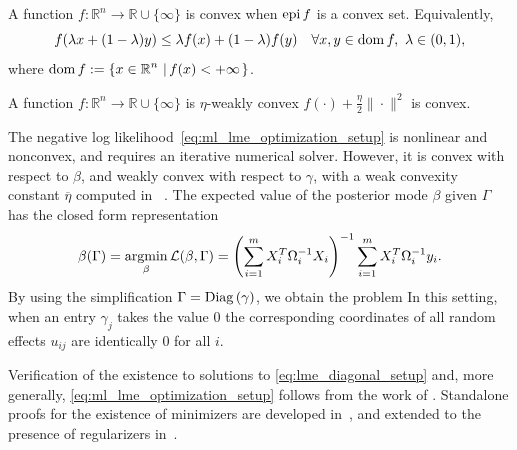 \begin{definition}[Convexity]
A function $f:\mathbb{R}^n\rightarrow \mathbb{R} \cup \{\infty\}$ is convex when $\operatorname{epi} f$ is a convex set. Equivalently, 
\[
f(\lambda x + (1-\lambda)y) \leq \lambda f(x) + (1-\lambda) f(y) \quad \forall x,y\in\operatorname{\mathrm{dom}}{f},\ \lambda \in (0,1),
\]
where $\operatorname{\mathrm{dom}}{f}:=\left\{x\in{\operatorname{\mathbb{R}}^n}\,\left|\,f(x)<+\infty\right.\right\}$.
\end{definition}

\begin{definition}
A function $f:\mathbb{R}^n\rightarrow \mathbb{R} \cup \{\infty\}$ is $\eta$-weakly convex 
$f(\cdot)+\frac{\eta}{2}\|\cdot\|^2$ is convex. 
\end{definition}

The negative log likelihood~\eqref{eq:ml_lme_optimization_setup}  is nonlinear and nonconvex, and requires an iterative numerical solver.
However, it is convex with respect to $\beta$, and weakly convex with respect to $\gamma$, with a weak convexity constant $\overline \eta$
computed in~\cite[Section 5.1]{Theory1} . The expected value of the posterior mode $\beta$ given $\Gamma$ has the closed form representation 
%	
\[
\label{eq:beta_formula}
	\beta(\Gamma) = \operatorname*{\mathrm{argmin}}_{\beta}\operatorname{\mathcal{L}}(\beta, \Gamma) = \left(\sum_{i = 1}^m X_i^T\Omega_i^{-1}X_i\right)^{-1}\sum_{i = 1}^mX_i^T\Omega_i^{-1}y_i.
\] %
By using the simplification $\Gamma=\mathrm{Diag}\left(\gamma\right)$, we obtain the problem
In this setting, when an
entry $\gamma_j$ takes the  value $0$ the corresponding coordinates of all random effects $u_{ij}$ are identically $0$ for all $i$. 

Verification of the existence to solutions to \eqref{eq:lme_diagonal_setup}
and, more generally, \eqref{eq:ml_lme_optimization_setup} follows from the work of \cite{zheng2021trimmed}.
Standalone proofs for the existence of minimizers are developed in~\cite[Theorem 1]{Theory1},
and extended to the presence of regularizers in~\cite[Theorem 2]{Theory1}. %


